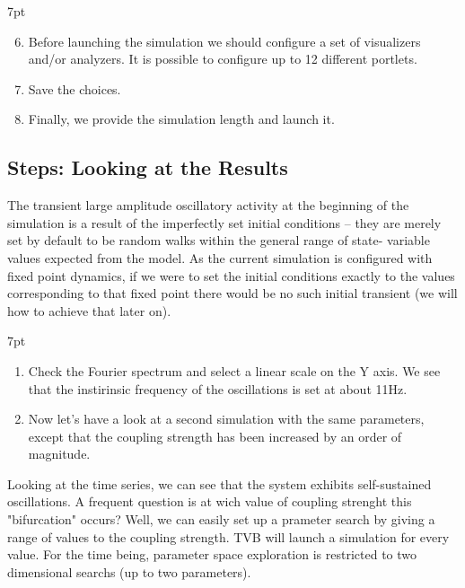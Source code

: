 \documentclass{tufte-handout}
\newenvironment{formal}{%
  \def\FrameCommand{%
    \hspace{1pt}%
    {\color{DarkBlue}\vrule width 2pt}%
    {\color{formalshade}\vrule width 4pt}%
    \colorbox{formalshade}%
  }%
  \MakeFramed{\advance\hsize-\width\FrameRestore}%
  \noindent\hspace{-4.55pt}%
  \begin{adjustwidth}{}{7pt}%
  \vspace{2pt}\vspace{2pt}%
}
{%
  \vspace{2pt}\end{adjustwidth}\endMakeFramed%
}
\newenvironment{simulation}{%
  \def\FrameCommand{%
    \hspace{1pt}%
    {\color{ForestGreen}\vrule width 2pt}%
    {\color{simulationshade}\vrule width 4pt}%
    \colorbox{simulationshade}%
  }%
  \MakeFramed{\advance\hsize-\width\FrameRestore}%
  \noindent\hspace{-4.55pt}%
  \begin{adjustwidth}{}{7pt}%
  \vspace{2pt}\vspace{2pt}%
}
{%
  \vspace{2pt}\end{adjustwidth}\endMakeFramed%
}
\begin{document}
\begin{simulation}
\begin{enumerate}[resume]
  \setcounter{enumi}{5}
\item Before launching the simulation we should configure a set of visualizers and/or analyzers. It is possible to configure up to 12 different portlets. 
\item Save the choices.
\item Finally, we provide the simulation length and launch it.
\end{enumerate}
\end{simulation}


\subsection{Steps: Looking at the Results}\label{sec:steps}


The transient large amplitude oscillatory activity at the beginning of the
simulation is a result of the imperfectly set initial conditions -- they are
merely set by default to be random walks within the general range of state-
variable values expected from the model. As the current simulation is
configured with fixed point dynamics, if we were to set the initial conditions
exactly to the values corresponding to that fixed point there would be no such
initial transient (we will how to achieve that later on).

\begin{formal}
\begin{enumerate}
\item Check the Fourier spectrum and select a linear scale on the Y axis. 
We see that the instirinsic frequency of the oscillations is set at about 11Hz. 
\item Now let's have a look at a second simulation with the same parameters, except that the coupling strength has been increased by an order of magnitude. 
\end{enumerate}
\end{formal}

Looking at the time series, we can see that the system exhibits self-sustained
oscillations. A frequent question is at wich value of coupling strenght this
"bifurcation" occurs? Well, we can easily set up a prameter search by giving a
range of values to the coupling strength. TVB will launch a simulation for
every value. For the time being, parameter space exploration is restricted to
two dimensional searchs (up to two parameters).
\end{document}
